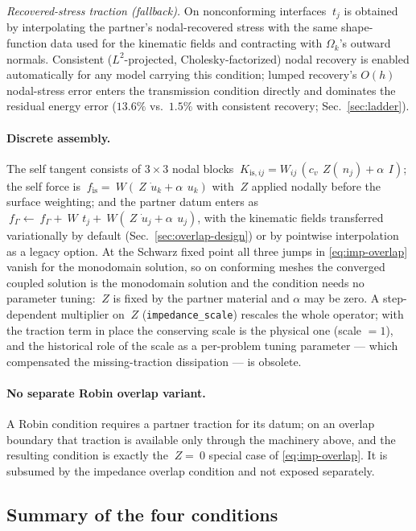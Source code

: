 \documentclass[11pt]{article}
\newcommand{\code}[1]{\texttt{#1}}
\begin{document}
\emph{Recovered-stress traction (fallback).} On nonconforming interfaces
$~t_j$ is obtained by interpolating the partner's nodal-recovered stress
with the same shape-function data used for the kinematic fields and
contracting with $\Omega_k$'s outward normals. Consistent ($L^2$-projected,
Cholesky-factorized) nodal recovery is enabled automatically for any model
carrying this condition; lumped recovery's $O(h)$ nodal-stress error enters
the transmission condition directly and dominates the residual energy
error ($13.6\%$ vs.\ $1.5\%$ with consistent recovery;
Sec.~\ref{sec:ladder}).

\paragraph{Discrete assembly.} The self tangent consists of $3\times 3$
nodal blocks $~K_{\mathrm{is},ij} = W_{ij}\,(c_v\,~Z(~n_j) + \alpha\,~I)$;
the self force is $~f_{\mathrm{is}} = ~W(~Z\,\dot{~u}_k + \alpha\,~u_k)$
with $~Z$ applied nodally before the surface weighting; and the partner
datum enters as
$~f_\Gamma \leftarrow ~f_\Gamma
 + ~W\,~t_j + ~W(~Z\,\dot{~u}_j + \alpha\,~u_j)$,
with the kinematic fields transferred variationally by default
(Sec.~\ref{sec:overlap-design}) or by pointwise interpolation as a legacy
option. At the Schwarz fixed point all three jumps in \eqref{eq:imp-overlap}
vanish for the monodomain solution, so on conforming meshes the converged
coupled solution is the monodomain solution and the condition needs no
parameter tuning: $~Z$ is fixed by the partner material and $\alpha$ may be
zero. A step-dependent multiplier on $~Z$ (\code{impedance\_scale}) rescales
the whole operator; with the traction term in place the conserving scale is
the physical one (scale $= 1$), and the historical role of the scale as a
per-problem tuning parameter --- which compensated the missing-traction
dissipation --- is obsolete.

\paragraph{No separate Robin overlap variant.} A Robin condition requires a
partner traction for its datum; on an overlap boundary that traction is
available only through the machinery above, and the resulting condition is
exactly the $~Z = ~0$ special case of \eqref{eq:imp-overlap}. It is subsumed
by the impedance overlap condition and not exposed separately.

\subsection{Summary of the four conditions}
\end{document}
